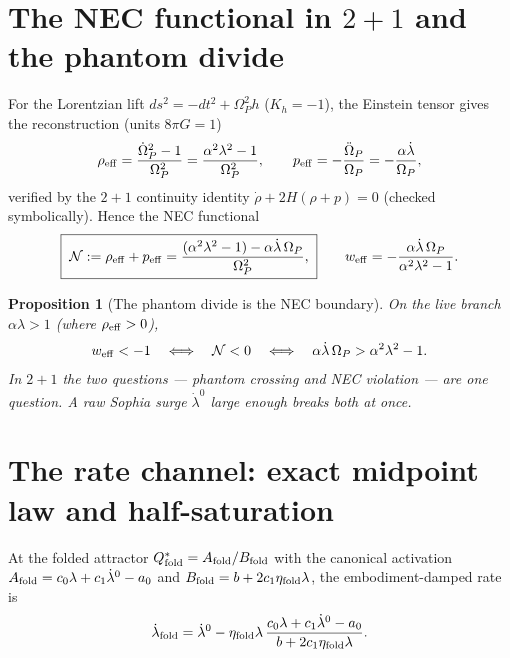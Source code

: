 \documentclass[11pt,a4paper,oneside]{book}
\newcommand{\Op}{\Omega_P}
\newcommand{\Qf}{Q_{\rm fold}}
\newcommand{\Af}{A_{\rm fold}}
\newcommand{\Bf}{B_{\rm fold}}
\newcommand{\ldz}{\dot\lambda^{0}}
\newcommand{\ldf}{\dot\lambda_{\rm fold}}
\newcommand{\NEC}{\mathcal N}
\theoremstyle{plain}
\newtheorem{proposition}{Proposition}[chapter]
\theoremstyle{definition}
\theoremstyle{remark}
\begin{document}
\section{The NEC functional in $2{+}1$ and the phantom divide}

For the Lorentzian lift $ds^2=-dt^2+\Op^2h$ ($K_h=-1$), the Einstein tensor gives the reconstruction
(units $8\pi G=1$)
\begin{equation}
\rho_{\rm eff}=\frac{\dot\Op^2-1}{\Op^2}=\frac{\alpha^2\lambda^2-1}{\Op^2},
\qquad
p_{\rm eff}=-\frac{\ddot\Op}{\Op}=-\frac{\alpha\dot\lambda}{\Op},
\end{equation}
verified by the $2{+}1$ continuity identity $\dot\rho+2H(\rho+p)=0$ (checked symbolically). Hence the
NEC functional
\begin{equation}
\boxed{\;\NEC:=\rho_{\rm eff}+p_{\rm eff}
=\frac{(\alpha^2\lambda^2-1)-\alpha\dot\lambda\,\Op}{\Op^{2}},\;}
\qquad
w_{\rm eff}=-\frac{\alpha\dot\lambda\,\Op}{\alpha^2\lambda^2-1}.
\end{equation}

\begin{proposition}[The phantom divide is the NEC boundary]\label{necrestoration:prop:divide}
On the live branch $\alpha\lambda>1$ (where $\rho_{\rm eff}>0$),
\begin{equation}
w_{\rm eff}<-1\quad\Longleftrightarrow\quad\NEC<0
\quad\Longleftrightarrow\quad
\alpha\dot\lambda\,\Op>\alpha^2\lambda^2-1 .
\end{equation}
In $2{+}1$ the two questions --- phantom crossing and NEC violation --- are one question. A raw Sophia
surge $\ldz$ large enough breaks both at once.
\end{proposition}

\section{The rate channel: exact midpoint law and half-saturation}

At the folded attractor $\Qf^*=\Af/\Bf$ with the canonical activation
$\Af=c_0\lambda+c_1\ldz-a_0$ and $\Bf=b+2c_1\eta_{\rm fold}\lambda$, the embodiment-damped rate is
\begin{equation}
\ldf=\ldz-\eta_{\rm fold}\lambda\,\frac{c_0\lambda+c_1\ldz-a_0}{b+2c_1\eta_{\rm fold}\lambda}.
\end{equation}
\end{document}
